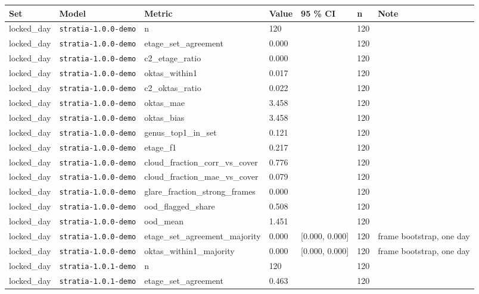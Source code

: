 \begin{center}{\scriptsize\setlength{\tabcolsep}{3pt}
\begin{tabular}{lllllll}
\toprule
Set & Model & Metric & Value & 95 \% CI & n & Note \\
\midrule
locked\_day & \texttt{stratia-1.0.0-demo} & n & 120 &  & 120 &  \\
locked\_day & \texttt{stratia-1.0.0-demo} & etage\_set\_agreement & 0.000 &  & 120 &  \\
locked\_day & \texttt{stratia-1.0.0-demo} & c2\_etage\_ratio & 0.000 &  & 120 &  \\
locked\_day & \texttt{stratia-1.0.0-demo} & oktas\_within1 & 0.017 &  & 120 &  \\
locked\_day & \texttt{stratia-1.0.0-demo} & c2\_oktas\_ratio & 0.022 &  & 120 &  \\
locked\_day & \texttt{stratia-1.0.0-demo} & oktas\_mae & 3.458 &  & 120 &  \\
locked\_day & \texttt{stratia-1.0.0-demo} & oktas\_bias & 3.458 &  & 120 &  \\
locked\_day & \texttt{stratia-1.0.0-demo} & genus\_top1\_in\_set & 0.121 &  & 120 &  \\
locked\_day & \texttt{stratia-1.0.0-demo} & etage\_f1 & 0.217 &  & 120 &  \\
locked\_day & \texttt{stratia-1.0.0-demo} & cloud\_fraction\_corr\_vs\_cover & 0.776 &  & 120 &  \\
locked\_day & \texttt{stratia-1.0.0-demo} & cloud\_fraction\_mae\_vs\_cover & 0.079 &  & 120 &  \\
locked\_day & \texttt{stratia-1.0.0-demo} & glare\_fraction\_strong\_frames & 0.000 &  & 120 &  \\
locked\_day & \texttt{stratia-1.0.0-demo} & ood\_flagged\_share & 0.508 &  & 120 &  \\
locked\_day & \texttt{stratia-1.0.0-demo} & ood\_mean & 1.451 &  & 120 &  \\
locked\_day & \texttt{stratia-1.0.0-demo} & etage\_set\_agreement\_majority & 0.000 & [0.000, 0.000] & 120 & frame bootstrap, one day \\
locked\_day & \texttt{stratia-1.0.0-demo} & oktas\_within1\_majority & 0.000 & [0.000, 0.000] & 120 & frame bootstrap, one day \\
locked\_day & \texttt{stratia-1.0.1-demo} & n & 120 &  & 120 &  \\
locked\_day & \texttt{stratia-1.0.1-demo} & etage\_set\_agreement & 0.463 &  & 120 &  \\

\end{tabular}}
\end{center}
